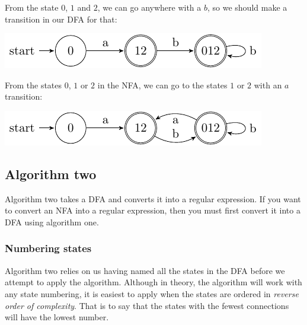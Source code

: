 From the state $0$, $1$ and $2$, we can go anywhere with a $b$, so we should
make a transition in our DFA for that:

\begin{center}
  \includegraphics{automata/9.pdf}
\end{center}

From the states $0$, $1$ or $2$ in the NFA, we can go to the states $1$ or $2$
with an $a$ transition:

\begin{center}
  \includegraphics{automata/10.pdf}
\end{center}


\subsection{Algorithm two}

Algorithm two takes a DFA and converts it into a regular expression. If you want
to convert an NFA into a regular expression, then you must first convert it into
a DFA using algorithm one.

\subsubsection{Numbering states}

Algorithm two relies on us having named all the states in the DFA before we
attempt to apply the algorithm. Although in theory, the algorithm will work with
any state numbering, it is easiest to apply when the states are ordered in {\it
reverse order of complexity}. That is to say that the states with the fewest
connections will have the lowest number.



